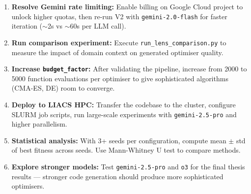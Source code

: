 \documentclass[a4paper,11pt]{article}
\begin{document}
\begin{enumerate}
    \item \textbf{Resolve Gemini rate limiting:} Enable billing on Google
          Cloud project to unlock higher quotas, then re-run V2 with
          \texttt{gemini-2.0-flash} for faster iteration ($\sim$2s vs
          $\sim$60s per LLM call).

    \item \textbf{Run comparison experiment:} Execute
          \texttt{run\_lens\_comparison.py} to measure the impact of domain
          context on generated optimiser quality.

    \item \textbf{Increase \texttt{budget\_factor}:} After validating the
          pipeline, increase from 2000 to 5000 function evaluations per
          optimiser to give sophisticated algorithms (CMA-ES, DE) room to
          converge.

    \item \textbf{Deploy to LIACS HPC:} Transfer the codebase to the cluster,
          configure SLURM job scripts, run large-scale experiments with
          \texttt{gemini-2.5-pro} and higher parallelism.

    \item \textbf{Statistical analysis:} With 3+ seeds per configuration,
          compute mean $\pm$ std of best fitness across seeds. Use
          Mann-Whitney U test to compare methods.

    \item \textbf{Explore stronger models:} Test \texttt{gemini-2.5-pro} and
          \texttt{o3} for the final thesis results — stronger code generation
          should produce more sophisticated optimisers.
\end{enumerate}
\end{document}
